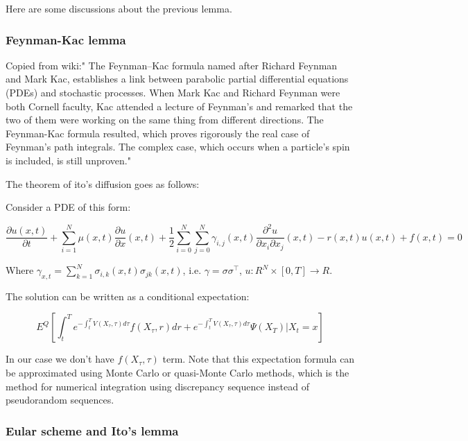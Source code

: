\documentclass[journal]{IEEEtran}
\begin{document}
Here are some discussions about the previous lemma.

\subsubsection{Feynman-Kac lemma}

Copied from wiki:" The Feynman–Kac formula named after Richard Feynman and Mark Kac, establishes a link between parabolic partial differential equations (PDEs) and stochastic processes. 
When Mark Kac and Richard Feynman were both Cornell faculty, Kac attended a lecture of Feynman's and remarked that the two of them were working on the same thing from different directions. 
The Feynman-Kac formula resulted, which proves rigorously the real case of Feynman's path integrals. The complex case, which occurs when a particle's spin is included, is still unproven."


The theorem of ito's diffusion goes as follows:

Consider a PDE of this form:

\begin{equation}
\frac{\partial u(x, t)}{\partial t} + \sum_{i=1}^{N}\mu(x,t) \frac{\partial u}{\partial x}(x, t) + \frac{1}{2}\sum_{i=0}^{N} \sum_{j=0}^{N}\gamma_{i,j}(x,t) \frac{\partial^2 u}{\partial x_{i} \partial x_{j}}(x,t) - r(x,t)u(x,t)+f(x,t) = 0 \nonumber
\end{equation}

Where $\gamma_{x,t} = \sum_{k=1}^{N}\sigma_{i,k}(x,t)\sigma_{jk}(x,t)$, i.e. $\gamma = \sigma \sigma^{\top}$, $u: R^{N} \times [0,T] \to R$.  

The solution can be written as a conditional expectation:

\begin{equation}
  E^{Q} [\int_{t}^{T}e^{-\int_{t}^{T}V(X_{\tau}, \tau)d\tau}f(X_{\tau},r)dr+ e^{-\int_{t}^{T}V(X_{\tau}, \tau)d\tau} \Psi(X_{T})|X_t = x] \nonumber
\end{equation}

In our case we don't have $f(X_{\tau},\tau)$ term. Note that this expectation formula can be approximated using Monte Carlo or quasi-Monte Carlo methods, which is the method for numerical integration using discrepancy sequence instead of pseudorandom sequences.


\subsubsection{Eular scheme and Ito's lemma}
\end{document}
